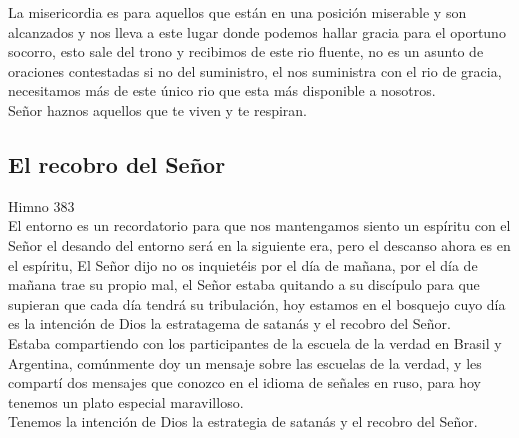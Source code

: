 \documentclass[12pt]{article}
\begin{document}
La misericordia es para aquellos que están en una posición miserable y son alcanzados y nos lleva a este lugar donde podemos hallar gracia para el oportuno socorro, esto sale del trono y recibimos de este rio fluente, no es un asunto de oraciones contestadas si no del suministro, el nos suministra con el rio de gracia, necesitamos más de este único rio que esta más disponible a nosotros.\\

Señor haznos aquellos que te viven y te respiran. 

\subsection*{El recobro del Señor}

Himno 383\\

El entorno es un recordatorio para que nos mantengamos siento un espíritu con el Señor el desando del entorno será en la siguiente era, pero el descanso ahora es en el espíritu, El Señor dijo no os inquietéis por el día de mañana, por el día de mañana trae su propio mal, el Señor estaba quitando a su discípulo para que supieran que cada día tendrá su tribulación, hoy estamos en el bosquejo cuyo día es la intención de Dios la estratagema de satanás y el recobro del Señor.\\

Estaba compartiendo con los participantes de la escuela de la verdad en Brasil y Argentina, comúnmente doy un mensaje sobre las escuelas de la verdad, y les compartí dos mensajes que conozco en el idioma de señales en ruso, para hoy tenemos un plato especial maravilloso.\\
 
Tenemos la intención de Dios la estrategia de satanás y el recobro del Señor.\\
\end{document}
